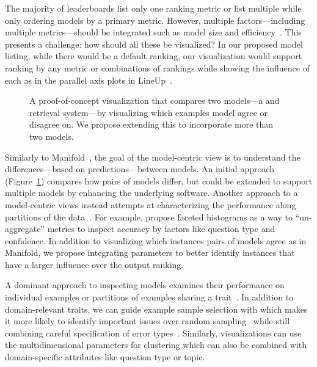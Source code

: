 The majority of leaderboards list only one ranking metric or list multiple while only ordering models by a primary metric.
However, multiple factors---including multiple metrics---should be integrated such as model size and efficiency~\citep{strubell2019energy}.
This presents a challenge: how should all these be visualized?
In our proposed model listing, while there would be a default ranking, our visualization would support ranking by any metric or combinations of rankings while showing the influence of each as in the parallel axis plots in LineUp~\citep{gratzl2013lineup}.

\begin{figure}[ht]
    \centering
    \caption{
        A proof-of-concept visualization that compares two models---a \bert{} and \ir{} retrieval system---by visualizing which examples model agree or disagree on.
        We propose extending this to incorporate more than two models.
    }
    \label{fig:pair}
\end{figure}

Similarly to Manifold~\citep{zhang2019manifold}, the goal of the model-centric view is to understand the differences---based on predictions---between models.
An initial approach (Figure~\ref{fig:pair}) compares how pairs of models differ, but could be extended to support multiple models by enhancing the underlying software.
Another approach to a model-centric views instead attempts at characterizing the performance along partitions of the data~\citep{liu2018answer}.
For example, \citet{arendt2020crosscheck} propose faceted histograms as a way to ``un-aggregate'' metrics to inspect \qa{} accuracy by factors like question type and confidence.
In addition to visualizing which instances pairs of models agree as in Manifold, we propose integrating \irt{} parameters to better identify instances that have a larger influence over the output ranking.

A dominant approach to inspecting models examines their performance on individual examples or partitions of examples sharing a trait~\citep{wadhwa2018compare}.
In addition to domain-relevant traits, we can guide example sample selection with \irt{} which makes it more likely to identify important issues over random sampling~\citep{wadhwa2018compare} while still combining careful specification of error types~\citep{wu2019errudite}.
Similarly, visualizations can use the multidimensional \irt{} parameters for clustering which can also be combined with domain-specific attributes like question type or topic.

